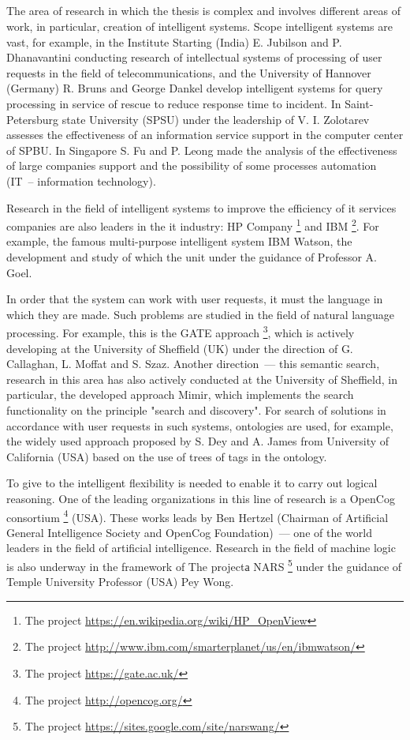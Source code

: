 \subsection*{}The area of research in which the thesis is complex and involves different areas of work, in particular, creation of intelligent systems. Scope intelligent systems are vast, for example, in the Institute Starting (India) E. Jubilson and P. Dhanavantini conducting research of intellectual systems of processing of user requests in the field of telecommunications, and the University of Hannover (Germany) R. Bruns and George Dankel develop intelligent systems for query processing in service of rescue to reduce response time to incident. In Saint-Petersburg state University (SPSU) under the leadership of V. I. Zolotarev assesses the effectiveness of an information service support in the computer center of SPBU. In Singapore S. Fu and P. Leong made the analysis of the effectiveness of large companies support and the possibility of some processes automation (IT~-- information technology).\par
Research in the field of intelligent systems to improve the efficiency of it services companies are also leaders in the it industry: HP Company \footnote{The project \url{https://en.wikipedia.org/wiki/HP_OpenView}} and IBM \footnote{The project \url{http://www.ibm.com/smarterplanet/us/en/ibmwatson/}}. For example, the famous multi-purpose intelligent system IBM Watson, the development and study of which the unit under the guidance of Professor A. Goel.  \par   In order that the system can work with user requests, it must  the language in which they are made. Such problems are studied in the field of natural language processing. For example, this is the GATE approach \footnote{The project \url{https://gate.ac.uk/}}, which is actively developing at the University of Sheffield (UK) under the direction of G. Callaghan, L. Moffat and S. Szaz. Another direction~--- this semantic search, research in this area has also actively conducted at the University of Sheffield, in particular, the developed approach Mimir, which implements the search functionality on the principle "search and discovery". For search of solutions in accordance with user requests in such systems, ontologies are used, for example, the widely used approach proposed by S. Dey and A. James from University of California (USA) based on the use of trees of tags in the ontology. \par
To give to the intelligent flexibility is needed to enable it to carry out logical reasoning. One of the leading organizations in this line of research is a OpenCog consortium \footnote{The project \url{http://opencog.org/}} (USA). These works leads by Ben Hertzel (Chairman of Artificial General Intelligence Society and OpenCog Foundation)~--- one of the world leaders in the field of artificial intelligence. Research in the field of machine logic is also underway in the framework of The projectа NARS \footnote{The project \url{https://sites.google.com/site/narswang/}} under the guidance of Temple University Professor (USA) Pey Wong. \par 

